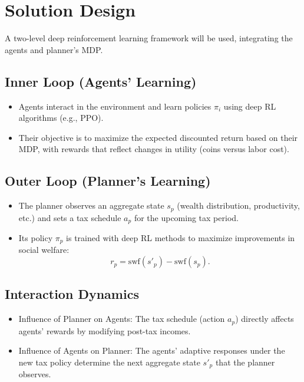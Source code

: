 \section{Solution Design}
A two-level deep reinforcement learning framework will be used, integrating the agents and planner's MDP.

\subsection{Inner Loop (Agents' Learning)}
\begin{itemize}
    \item Agents interact in the environment and learn policies \( \pi_i \) using deep RL algorithms (e.g., PPO).
    \item Their objective is to maximize the expected discounted return based on their MDP, with rewards that reflect changes in utility (coins versus labor cost).
\end{itemize}

\subsection{Outer Loop (Planner's Learning)}
\begin{itemize}
    \item The planner observes an aggregate state \( s_p \) (wealth distribution, productivity, etc.) and sets a tax schedule \( a_p \) for the upcoming tax period.
    \item Its policy \( \pi_p \) is trained with deep RL methods to maximize improvements in social welfare:
    \[
    r_p = \text{swf}(s'_p) - \text{swf}(s_p).
    \]
\end{itemize}

\subsection{Interaction Dynamics}
\begin{itemize}
    \item Influence of Planner on Agents: The tax schedule (action \( a_p \)) directly affects agents’ rewards by modifying post-tax incomes.
    \item Influence of Agents on Planner: The agents’ adaptive responses under the new tax policy determine the next aggregate state \( s'_p \) that the planner observes.
\end{itemize}